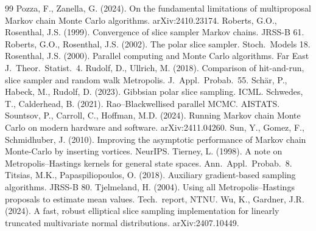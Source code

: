 \documentclass[11pt,a4paper]{article}
\theoremstyle{remark}
\begin{document}
\begin{thebibliography}{99}
 Pozza, F., Zanella, G. (2024). On the fundamental limitations of multiproposal Markov chain Monte Carlo algorithms. arXiv:2410.23174.
 Roberts, G.O., Rosenthal, J.S. (1999). Convergence of slice sampler Markov chains. JRSS-B 61.
 Roberts, G.O., Rosenthal, J.S. (2002). The polar slice sampler. Stoch.\ Models 18.
 Rosenthal, J.S. (2000). Parallel computing and Monte Carlo algorithms. Far East J.\ Theor.\ Statist.\ 4.
 Rudolf, D., Ullrich, M. (2018). Comparison of hit-and-run, slice sampler and random walk Metropolis. J.\ Appl.\ Probab.\ 55.
 Schär, P., Habeck, M., Rudolf, D. (2023). Gibbsian polar slice sampling. ICML.
 Schwedes, T., Calderhead, B. (2021). Rao--Blackwellised parallel MCMC. AISTATS.
 Sountsov, P., Carroll, C., Hoffman, M.D. (2024). Running Markov chain Monte Carlo on modern hardware and software. arXiv:2411.04260.
 Sun, Y., Gomez, F., Schmidhuber, J. (2010). Improving the asymptotic performance of Markov chain Monte-Carlo by inserting vortices. NeurIPS.
 Tierney, L. (1998). A note on Metropolis--Hastings kernels for general state spaces. Ann.\ Appl.\ Probab.\ 8.
 Titsias, M.K., Papaspiliopoulos, O. (2018). Auxiliary gradient-based sampling algorithms. JRSS-B 80.
 Tjelmeland, H. (2004). Using all Metropolis--Hastings proposals to estimate mean values. Tech.\ report, NTNU.
 Wu, K., Gardner, J.R. (2024). A fast, robust elliptical slice sampling implementation for linearly truncated multivariate normal distributions. arXiv:2407.10449.
\end{thebibliography}
\end{document}
